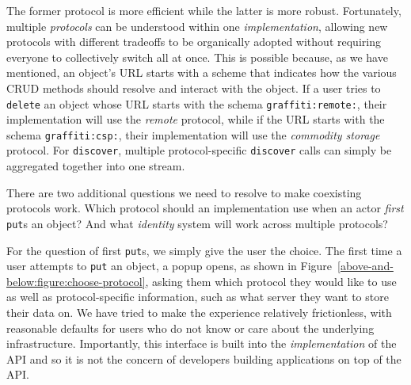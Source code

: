 The former protocol is more efficient while the latter is more robust.
Fortunately, multiple \emph{protocols} can be understood within one \emph{implementation},
allowing new protocols
with different tradeoffs to be organically adopted without requiring
everyone to collectively switch all at once.
This is possible because, as we have mentioned, an object's URL starts with a scheme that indicates
how the various CRUD methods should resolve and interact with the object.
If a user tries to \texttt{delete} an object whose URL starts with the schema
\texttt{graffiti:remote:}, their implementation will use the \emph{remote}
protocol, while if the URL starts with the schema \texttt{graffiti:csp:},
their implementation will use the \emph{commodity storage} protocol.
For \texttt{discover}, multiple protocol-specific \texttt{discover}
calls can simply be aggregated together into one stream.

There are two additional questions we need to resolve to
make coexisting protocols work.
Which protocol should an implementation use
when an actor \emph{first} \texttt{put}s an object?
And what \emph{identity} system will work across multiple
protocols?

For the question of first \texttt{put}s, we simply give the user the choice.
The first time a user attempts to \texttt{put} an object,
a popup opens,
as shown in Figure~\ref{above-and-below:figure:choose-protocol},
asking them which protocol they would like to use
as well as protocol-specific information, such as what server
they want to store their data on.
We have tried to make the experience relatively frictionless, with
reasonable defaults for
users who do not know or care about the underlying infrastructure.
Importantly, this interface is built into the \emph{implementation}
of the API and so it is not the concern of developers building
applications on top of the API.

